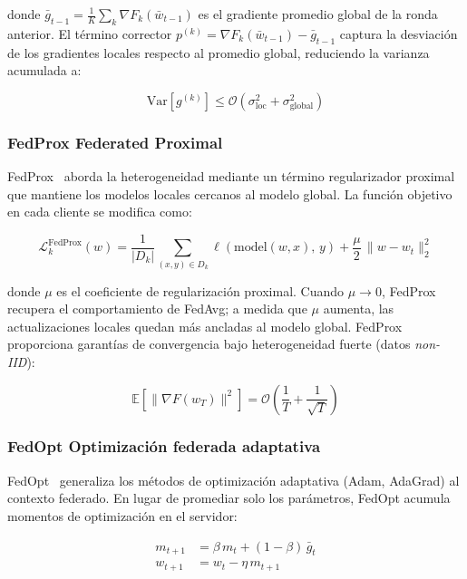 donde $\bar{g}_{t-1} = \frac{1}{K}\sum_{k} \nabla F_k(\bar{w}_{t-1})$ es el gradiente
promedio global de la ronda anterior. El término corrector
$p^{(k)} = \nabla F_k(\bar{w}_{t-1}) - \bar{g}_{t-1}$ captura la desviación de los
gradientes locales respecto al promedio global, reduciendo la varianza acumulada a:
 
\[
\mathrm{Var}\!\left[g^{(k)}\right] \leq
    \mathcal{O}\!\left(\sigma_{\mathrm{loc}}^2 + \sigma_{\mathrm{global}}^2\right)
\]
 
\subsubsection{FedProx  Federated Proximal}
 
FedProx~\citep{reddi2020adaptive} aborda la heterogeneidad mediante un término
regularizador proximal que mantiene los modelos locales cercanos al modelo global.
La función objetivo en cada cliente se modifica como:
 
\begin{equation}
    \mathcal{L}_k^{\mathrm{FedProx}}(w) =
        \frac{1}{|D_k|} \sum_{(x,y) \in D_k} \ell\!\left(\mathrm{model}(w, x),\, y\right)
        + \frac{\mu}{2}\,\|w - w_t\|_2^2
\end{equation}
 
donde $\mu$ es el coeficiente de regularización proximal. Cuando $\mu \to 0$, FedProx
recupera el comportamiento de FedAvg; a medida que $\mu$ aumenta, las actualizaciones
locales quedan más ancladas al modelo global. FedProx proporciona garantías de convergencia
bajo heterogeneidad fuerte (datos \textit{non-IID}):
 
\[
\mathbb{E}\!\left[\|\nabla F(w_T)\|^2\right] =
    \mathcal{O}\!\left(\frac{1}{T} + \frac{1}{\sqrt{T}}\right)
\]
 
\subsubsection{FedOpt  Optimización federada adaptativa}
 
FedOpt~\citep{reddi2020adaptive} generaliza los métodos de optimización adaptativa (Adam,
AdaGrad) al contexto federado. En lugar de promediar solo los parámetros, FedOpt acumula
momentos de optimización en el servidor:
 
\begin{align}
    m_{t+1} &= \beta\, m_t + (1-\beta)\,\bar{g}_t \\
    w_{t+1} &= w_t - \eta\, m_{t+1}
\end{align}
 
